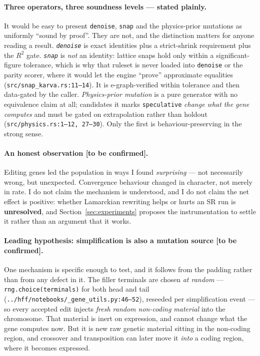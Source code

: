 \documentclass[sigconf]{acmart}
\begin{document}
\paragraph{Three operators, three soundness levels --- stated plainly.} It would
be easy to present \texttt{denoise}, \texttt{snap} and the physics-prior
mutations as uniformly ``sound by proof''. They are not, and the distinction
matters for anyone reading a result.
\emph{\texttt{denoise}} is exact identities plus a strict-shrink requirement plus
the $R^2$ gate.
\emph{\texttt{snap}} is \emph{not} an identity: lattice snaps hold only within a
significant-figure tolerance, which is why that ruleset is never loaded into
\texttt{denoise} or the parity scorer, where it would let the engine ``prove''
approximate equalities (\texttt{src/snap\_karva.rs:11--14}). It is e-graph-verified
within tolerance and then data-gated by the caller.
\emph{Physics-prior mutation} is a pure generator with no equivalence claim at
all; candidates it marks \texttt{speculative} \emph{change what the gene computes}
and must be gated on extrapolation rather than holdout
(\texttt{src/physics.rs:1--12, 27--30}). Only the first is behaviour-preserving in the
strong sense.

\paragraph{An honest observation [to be confirmed].} Editing genes led the
population in ways I found \emph{surprising} --- not necessarily wrong, but
unexpected. Convergence behaviour changed in character, not merely in rate. I do
not claim the mechanism is understood, and I do not claim the net effect is
positive: whether Lamarckian rewriting helps or hurts an SR run is
\textbf{unresolved}, and Section~\ref{sec:experiments} proposes the instrumentation
to settle it rather than an argument that it works.

\paragraph{Leading hypothesis: simplification is also a mutation source [to be
confirmed].} One mechanism is specific enough to test, and it follows from the
padding rather than from any defect in it. The filler terminals are chosen
\emph{at random} --- \texttt{rng.choice(terminals)} for both head and tail
(\texttt{../hff/notebooks/\_gene\_utils.py:46--52}), reseeded per simplification
event --- so every accepted edit injects \emph{fresh random non-coding material}
into the chromosome. That material is inert on expression, and cannot change what
the gene computes now. But it is new raw genetic material sitting in the
non-coding region, and crossover and transposition can later move it \emph{into}
a coding region, where it becomes expressed.
\end{document}
